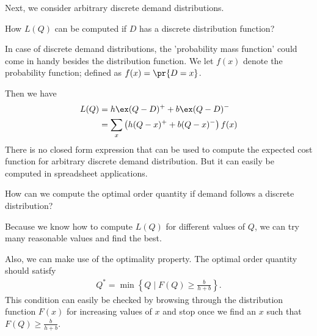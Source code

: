 Next, we consider arbitrary discrete demand distributions. 

\begin{question}
How $L(Q)$ can be computed if $D$ has a discrete distribution function?
\end{question}

\begin{solution}
In case of discrete demand distributions, the 'probability mass function' could come in handy besides the distribution function. We let $f(x)$ denote the probability function; defined as $f(x)=\pr{D=x}$. 

Then we have
\begin{align*}
L(Q) & = h \ex (Q-D)^+ + b \ex (Q-D)^- \\
	 & = \sum_x \left(h (Q-x)^+ + b (Q-x)^-\right) f(x)
\end{align*}
There is no closed form expression that can be used to compute the expected cost function for arbitrary discrete demand distribution. But it can easily be computed in spreadsheet applications. 
\end{solution}

\begin{question}
How can we compute the optimal order quantity if demand follows a discrete distribution?
\end{question}

\begin{solution}
Because we know how to compute $L(Q)$ for different values of $Q$, we can try many reasonable values and find the best. 

Also, we can make use of the optimality property. The optimal order quantity should satisfy 
\begin{align*}
Q^* = \min\left\{Q\mid F(Q)\geq \frac{b}{h+b}\right\}.
\end{align*}
This condition can easily be checked by browsing through the distribution function $F(x)$ for increasing values of $x$ and stop once we find an $x$ such that $F(Q)\geq \frac{b}{h+b}$.
\end{solution}
